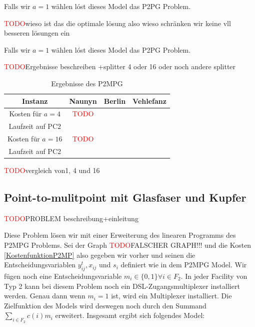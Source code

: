 \documentclass[11pt,a4paper]{article}
\newcommand{\TODO}{\textcolor{red}{TODO}}
\theoremstyle{my_th_style1}
\begin{document}
  Falls wir $a=1$ w\"ahlen l\'ost dieses  Model das P2PG Problem.
  
 \TODO wieso ist das die optimale lösung also wieso schränken wir keine vll besseren 
 lösungen ein
 
  Falls wir $a=1$ w\"ahlen l\'ost dieses  Model das P2PG Problem.
 
 \TODO Ergebnisse beschreiben +splitter 4 oder 16 oder noch andere splitter
 \begin{table}[h]
 	\centering
 	\begin{tabular}{c|c|c|c}
 		Instanz & Naunyn & Berlin & Vehlefanz \\	
 		\hline
 		Kosten für $a=4$ & \TODO &  &  \\
 		 Laufzeit auf PC2 &  &  & \\
 		 \hline
 		Kosten für $a=16$ & \TODO &  &  \\
 		Laufzeit auf PC2 &  &  & \\
 	\end{tabular}
 	\label{P2MPG}
 	\caption{Ergebnisse des P2MPG} 
 \end{table}
 \TODO vergleich von1, 4 und 16 
 
 \subsection{Point-to-mulitpoint mit Glasfaser und Kupfer}
\TODO PROBLEM beschreibung+einleitung

Diese Problem lösen wir mit einer Erweiterung des linearen Programms des P2MPG Problems. Sei der Graph \TODO FALSCHER GRAPH!!! und die Kosten \eqref{KostenfunktionP2MP} also gegeben wir vorher und  seinen die Entscheidungsvariablen $y_{ij}^t,x_{ij}$ und $s_i$ definiert wie in dem P2MPG Model. Wir fügen noch eine Entscheidungsvariable $m_i \in \{0,1\} \forall i \in F_2$. In jeder Facility von Typ 2 kann bei diesem Problem noch ein DSL-Zugangsmultiplexer installiert werden. Genau dann wenn $m_i=1$ ist, wird ein Multiplexer installiert. Die Zielfunktion des Models wird deswegen noch durch den Summand $\displaystyle\sum_{i \in F_2} c(i) m_i$ erweitert. Insgesamt ergibt sich folgendes Model:
\end{document}
